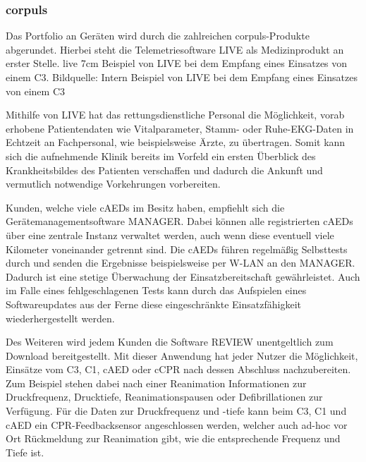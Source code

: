\subsubsection{\textsf{corpuls\color{corpulsred}{.web}}}
Das Portfolio an Geräten wird durch die zahlreichen \textsf{corpuls\color{corpulsred}{.web}}-Produkte abgerundet.
Hierbei steht die Telemetriesoftware \gls{LIVE} als Medizinprodukt an erster Stelle.
\bild
{live}
{7cm}
{Beispiel von \acrlong{LIVE} bei dem Empfang eines Einsatzes von einem \acrlong{C3}. Bildquelle: Intern}
{Beispiel von \acrlong*{LIVE} bei dem Empfang eines Einsatzes von einem \acrlong*{C3}}

Mithilfe von \gls{LIVE} hat das rettungsdienstliche Personal die Möglichkeit, vorab erhobene Patientendaten wie Vitalparameter, Stamm- oder Ruhe-EKG-Daten in Echtzeit an Fachpersonal, wie beispielsweise Ärzte, zu übertragen.
Somit kann sich die aufnehmende Klinik bereits im Vorfeld ein ersten Überblick des Krankheitsbildes des Patienten verschaffen und dadurch die Ankunft und vermutlich notwendige Vorkehrungen vorbereiten.


Kunden, welche viele \gls{cAED}s im Besitz haben, empfiehlt sich die Gerätemanagementsoftware \gls{MANAGER}.
Dabei können alle registrierten \gls{cAED}s über eine zentrale Instanz verwaltet werden, auch wenn diese eventuell viele Kilometer voneinander getrennt sind.
Die \gls{cAED}s führen regelmäßig Selbsttests durch und senden die Ergebnisse beispielsweise per W-LAN an den \gls{MANAGER}.
Dadurch ist eine stetige Überwachung der Einsatzbereitschaft gewährleistet.
Auch im Falle eines fehlgeschlagenen Tests kann durch das Aufspielen eines Softwareupdates aus der Ferne diese eingeschränkte Einsatzfähigkeit wiederhergestellt werden.

Des Weiteren wird jedem Kunden die Software \gls{REVIEW} unentgeltlich zum Download bereitgestellt.
Mit dieser Anwendung hat jeder Nutzer die Möglichkeit, Einsätze vom \gls{C3}, \gls{C1}, \gls{cAED} oder \gls{cCPR} nach dessen Abschluss nachzubereiten.
Zum Beispiel stehen dabei nach einer Reanimation Informationen zur Druckfrequenz, Drucktiefe, Reanimationspausen oder Defibrillationen zur Verfügung.
Für die Daten zur Druckfrequenz und -tiefe kann beim \gls{C3}, \gls{C1} und \gls{cAED} ein CPR-Feedbacksensor angeschlossen werden, welcher auch ad-hoc vor Ort Rückmeldung zur Reanimation gibt, wie die entsprechende Frequenz und Tiefe ist.

